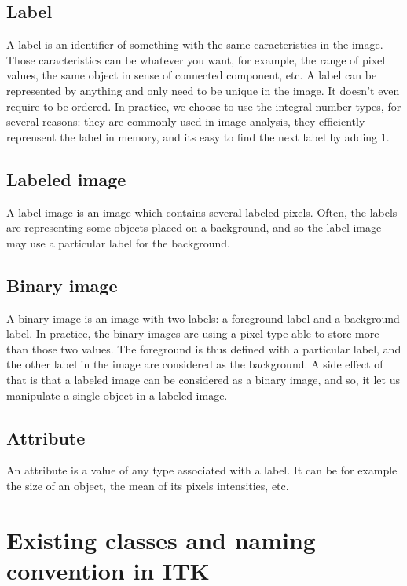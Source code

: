\documentclass{InsightArticle}
\begin{document}
\subsection{Label}

A label is an identifier of something with the same caracteristics in the image. Those caracteristics can be whatever you want, for example, the range of pixel values, the same object in sense of connected component, etc.
A label can be represented by anything and only need to be unique in the image. It doesn't even require to be ordered. In practice, we choose to use the integral number types, for several reasons: they are commonly used in image analysis, they efficiently reprensent the label in memory, and its easy to find the next label by adding 1.

\subsection{Labeled image}

A label image is an image which contains several labeled pixels. Often, the labels are representing some objects placed on a background, and so the label image may use a particular label for the background.


\subsection{Binary image}

A binary image is an image with two labels: a foreground label and a background label. In practice, the binary images are using a pixel type able to store more than those two values. The foreground is thus defined with a particular label, and the other label in the image are considered as the background. A side effect of that is that a labeled image can be considered as a binary image, and so, it let us manipulate a single object in a labeled image.

\subsection{Attribute}

An attribute is a value of any type associated with a label. It can be for example the size of an object, the mean of its pixels intensities, etc.

\section{Existing classes and naming convention in ITK}
\end{document}
